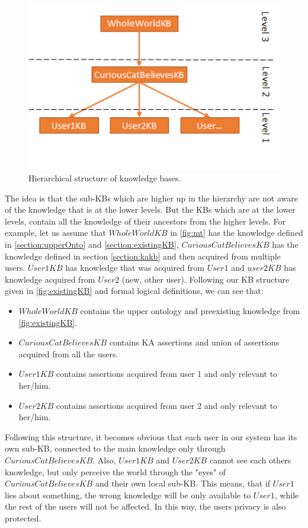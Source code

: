 \begin{figure}[H]
	\centering
		\includegraphics[width=1\textwidth]{figures/microtheories.png}
	\caption{Hierarchical structure of knowledge bases.}
	\label{fig:mt}
\end{figure}

The idea is that the sub-KBs which are higher up in the hierarchy are not aware
of the knowledge that is at the lower levels. But the KBs which are at the lower
levels, contain all the knowledge of their ancestors from the higher levels. 
For example,  let us assume that $WholeWorldKB$  in \autoref{fig:mt} has the 
knowledge defined in \autoref{section:upperOnto} and 
\autoref{section:existingKB}, $CuriousCatBelievesKB$ has the knowledge defined
in section \autoref{section:kakb} and then acquired from multiple users. 
$User1KB$ has knowledge that was acquired from $User1$ and $user2KB$ has 
knowledge acquired from $User2$ (new, other user). Following our KB structure 
given in \autoref{fig:existingKB} and formal logical definitions, 
we can see that:
\begin{itemize}
\item $WholeWorldKB$ contains the upper ontology and preexisting knowledge 
from \autoref{fig:existingKB}.
\item $CuriousCatBelievesKB$ contains KA assertions and union of assertions 
acquired from all the users.
\item $User1KB$ contains assertions acquired from user 1 and only relevant to 
her/him.
\item $User2KB$ contains assertions acquired from user 2 and only relevant to 
her/him.
\end{itemize}

Following this structure, it becomes obvious that each user in our system has 
its own sub-KB, connected to the main knowledge only through 
$CuriousCatBelievesKB$. Also, $User1KB$ and $User2KB$ cannot see each others 
knowledge, but only perceive the world through the "eyes" of 
$CuriousCatBelievesKB$ and their own local sub-KB. This means, that if $User1$ 
lies about something, the wrong knowledge will be only available to $User1$, 
while the rest of the users will not be affected. In this way, the users privacy
is also protected.

